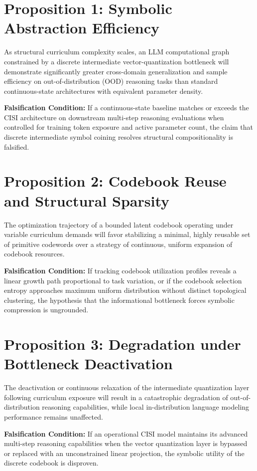 \section*{Proposition 1: Symbolic Abstraction Efficiency}
As structural curriculum complexity scales, an LLM computational graph constrained by a discrete intermediate vector-quantization bottleneck will demonstrate significantly greater cross-domain generalization and sample efficiency on out-of-distribution (OOD) reasoning tasks than standard continuous-state architectures with equivalent parameter density.

\textbf{Falsification Condition:} If a continuous-state baseline matches or exceeds the CISI architecture on downstream multi-step reasoning evaluations when controlled for training token exposure and active parameter count, the claim that discrete intermediate symbol coining resolves structural compositionality is falsified.

\section*{Proposition 2: Codebook Reuse and Structural Sparsity}
The optimization trajectory of a bounded latent codebook operating under variable curriculum demands will favor stabilizing a minimal, highly reusable set of primitive codewords over a strategy of continuous, uniform expansion of codebook resources.

\textbf{Falsification Condition:} If tracking codebook utilization profiles reveals a linear growth path proportional to task variation, or if the codebook selection entropy approaches maximum uniform distribution without distinct topological clustering, the hypothesis that the informational bottleneck forces symbolic compression is ungrounded.

\section*{Proposition 3: Degradation under Bottleneck Deactivation}
The deactivation or continuous relaxation of the intermediate quantization layer following curriculum exposure will result in a catastrophic degradation of out-of-distribution reasoning capabilities, while local in-distribution language modeling performance remains unaffected.

\textbf{Falsification Condition:} If an operational CISI model maintains its advanced multi-step reasoning capabilities when the vector quantization layer is bypassed or replaced with an unconstrained linear projection, the symbolic utility of the discrete codebook is disproven.

